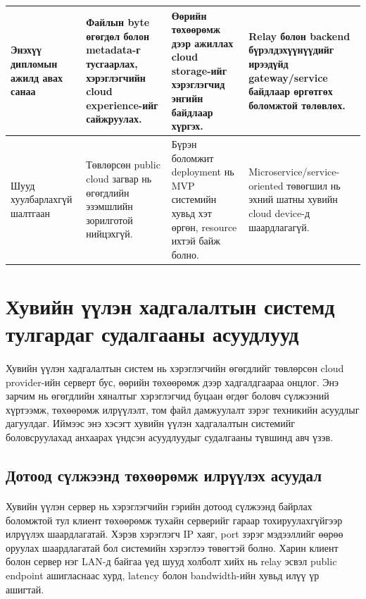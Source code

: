 \begin{table}[H]
\begin{tabular}{|p{3.2cm}|p{3.6cm}|p{3.6cm}|p{4.0cm}|}
Энэхүү дипломын ажилд авах санаа &
Файлын byte өгөгдөл болон metadata-г тусгаарлах, хэрэглэгчийн cloud experience-ийг сайжруулах. &
Өөрийн төхөөрөмж дээр ажиллах cloud storage-ийг хэрэглэгчид энгийн байдлаар хүргэх. &
Relay болон backend бүрэлдэхүүнүүдийг ирээдүйд gateway/service байдлаар өргөтгөх боломжтой төлөвлөх. \\ \hline

Шууд хуулбарлахгүй шалтгаан &
Төвлөрсөн public cloud загвар нь өгөгдлийн эзэмшлийн зорилготой нийцэхгүй. &
Бүрэн боломжит deployment нь MVP системийн хувьд хэт өргөн, resource ихтэй байж болно. &
Microservice/service-oriented төвөгшил нь эхний шатны хувийн cloud device-д шаардлагагүй. \\ \hline

\end{tabular}
\end{table}

\section{Хувийн үүлэн хадгалалтын системд тулгардаг судалгааны асуудлууд}

\paragraph{}
Хувийн үүлэн хадгалалтын систем нь хэрэглэгчийн өгөгдлийг төвлөрсөн cloud provider-ийн серверт бус, өөрийн төхөөрөмж дээр хадгалдгаараа онцлог. Энэ зарчим нь өгөгдлийн хяналтыг хэрэглэгчид буцаан өгдөг боловч сүлжээний хүртээмж, төхөөрөмж илрүүлэлт, том файл дамжуулалт зэрэг техникийн асуудлыг дагуулдаг. Иймээс энэ хэсэгт хувийн үүлэн хадгалалтын системийг боловсруулахад анхаарах үндсэн асуудлуудыг судалгааны түвшинд авч үзэв.

\subsection{Дотоод сүлжээнд төхөөрөмж илрүүлэх асуудал}
\label{sec:lan-detection}

\paragraph{}
Хувийн үүлэн сервер нь хэрэглэгчийн гэрийн дотоод сүлжээнд байрлах боломжтой тул клиент төхөөрөмж тухайн серверийг гараар тохируулахгүйгээр илрүүлэх шаардлагатай. Хэрэв хэрэглэгч IP хаяг, port зэрэг мэдээллийг өөрөө оруулах шаардлагатай бол системийн хэрэглээ төвөгтэй болно. Харин клиент болон сервер нэг LAN-д байгаа үед шууд холболт хийх нь relay эсвэл public endpoint ашигласнаас хурд, latency болон bandwidth-ийн хувьд илүү үр ашигтай.

